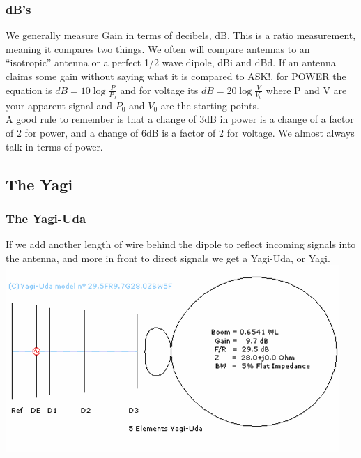 \documentclass[10pt, handout]{beamer}
\begin{document}
\begin{frame}
\frametitle{dB's}
We generally measure Gain in terms of decibels, dB. This is a ratio measurement, meaning it compares two things. We often will compare antennas to an ``isotropic'' antenna or a perfect 1/2 wave dipole, dBi and dBd. If an antenna claims some gain without saying what it is compared to ASK!. for POWER the equation is $dB=10\log\frac{P}{P_0}$ and for voltage its $dB=20\log\frac{V}{V_0}$ where P and V are your apparent signal and $P_0$ and $V_0$ are the starting points.\\
A good rule to remember is that a change of 3dB in power is a change of a factor of 2 for power, and a change of 6dB is a factor of 2 for voltage. We almost always talk in terms of power.
\end{frame}

\subsection{The Yagi}

\begin{frame}
\frametitle{The Yagi-Uda}
If we add another length of wire behind the dipole to reflect incoming signals into the antenna, and more in front to direct signals we get a Yagi-Uda, or Yagi.\\
\includegraphics[height=.5\textheight]{yagi.png}
\end{frame}
\end{document}
